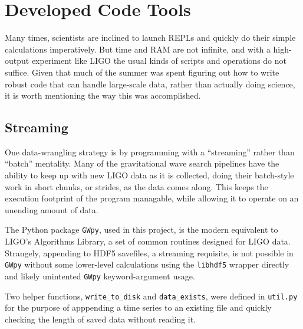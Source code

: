 \documentclass[colorlinks=true,pdfstartview=FitV,linkcolor=blue,
            citecolor=red,urlcolor=magenta]{ligodoc}
\begin{document}
\section{Developed Code Tools}
Many times, scientists are inclined to launch REPLs and quickly do their simple calculations imperatively.
But time and RAM are not infinite, and with a high-output experiment like LIGO the usual kinds of scripts and operations do not suffice.
Given that much of the summer was spent figuring out how to write robust code that can handle large-scale data, rather than actually doing science, it is worth mentioning the way this was accomplished.

\subsection{Streaming}
One data-wrangling strategy is by programming with a ``streaming'' rather than ``batch'' mentality.
Many of the gravitational wave search pipelines have the ability to keep up with new LIGO data as it is collected, doing their batch-style work in short chunks, or strides, as the data comes along.
This keeps the execution footprint of the program managable, while allowing it to operate on an unending amount of data.

The Python package \texttt{GWpy}, used in this project, is the modern equivalent to LIGO's Algorithms Library, a set of common routines designed for LIGO data.
Strangely, appending to HDF5 savefiles, a streaming requisite, is not possible in \texttt{GWpy} without some lower-level calculations using the \texttt{libhdf5} wrapper directly and likely unintented \texttt{GWpy} keyword-argument usage.

Two helper functions, \texttt{write\_to\_disk} and \texttt{data\_exists}, were defined in \texttt{util.py} for the purpose of apppending a time series to an existing file and quickly checking the length of saved data without reading it.
\end{document}
